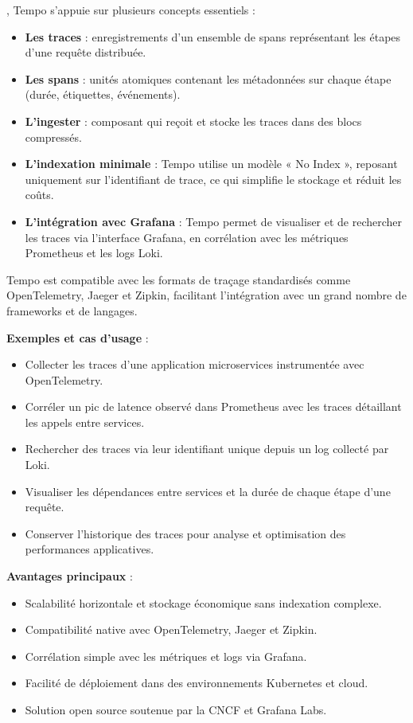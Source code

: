 , Tempo s’appuie sur plusieurs concepts essentiels  :
\begin{itemize}
	\item \textbf{Les traces}  : enregistrements d’un ensemble de spans représentant les étapes d’une requête distribuée.
	\item \textbf{Les spans}  : unités atomiques contenant les métadonnées sur chaque étape (durée, étiquettes, événements).
	\item \textbf{L’ingester}  : composant qui reçoit et stocke les traces dans des blocs compressés.
	\item \textbf{L’indexation minimale}  : Tempo utilise un modèle «  No Index  », reposant uniquement sur l’identifiant de trace, ce qui simplifie le stockage et réduit les coûts.
	\item \textbf{L’intégration avec Grafana}  : Tempo permet de visualiser et de rechercher les traces via l’interface Grafana, en corrélation avec les métriques Prometheus et les logs Loki.
\end{itemize}

Tempo est compatible avec les formats de traçage standardisés comme OpenTelemetry, Jaeger et Zipkin, facilitant l’intégration avec un grand nombre de frameworks et de langages.

\textbf{Exemples et cas d’usage} :
\begin{itemize}
	\item Collecter les traces d’une application microservices instrumentée avec OpenTelemetry.
	\item Corréler un pic de latence observé dans Prometheus avec les traces détaillant les appels entre services.
	\item Rechercher des traces via leur identifiant unique depuis un log collecté par Loki.
	\item Visualiser les dépendances entre services et la durée de chaque étape d’une requête.
	\item Conserver l’historique des traces pour analyse et optimisation des performances applicatives.
\end{itemize}

\textbf{Avantages principaux} :
\begin{itemize}
	\item Scalabilité horizontale et stockage économique sans indexation complexe.
	\item Compatibilité native avec OpenTelemetry, Jaeger et Zipkin.
	\item Corrélation simple avec les métriques et logs via Grafana.
	\item Facilité de déploiement dans des environnements Kubernetes et cloud.
	\item Solution open source soutenue par la CNCF et Grafana Labs.
\end{itemize}

